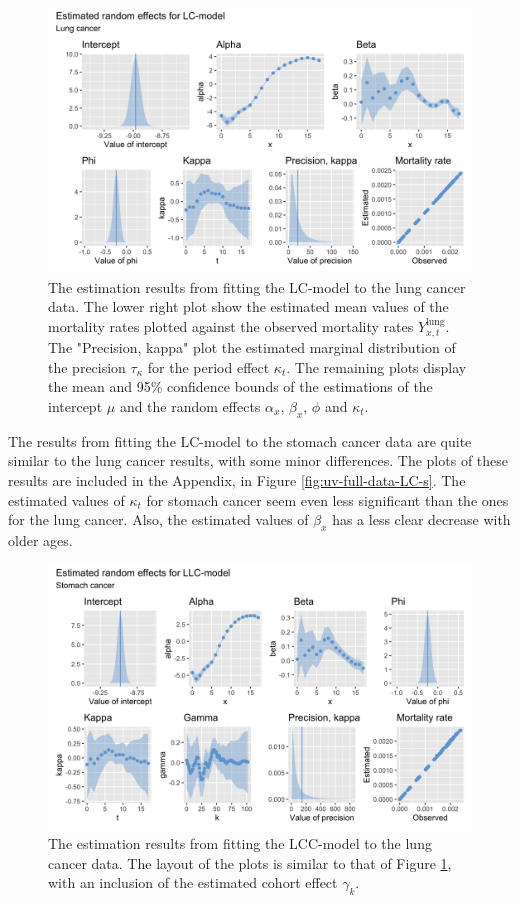 \begin{figure}[h!]
    \centering
    \includegraphics[width=0.85\linewidth]{real-data/real-data-univariate/Figures/uv-full-data-lc-l.png}
    \caption{The estimation results from fitting the LC-model to the lung cancer data. The lower right plot show the estimated mean values of the mortality rates plotted against the observed mortality rates $Y_{x,t}^{\text{lung}}$. The "Precision, kappa" plot the estimated marginal distribution of the precision $\tau_\kappa$ for the period effect $\kappa_t$. The remaining plots display the mean and 95\% confidence bounds of the estimations of the intercept $\mu$ and the random effects $\alpha_x$, $\beta_x$, $\phi$ and $\kappa_t$.}
    \label{fig:uv-full-data-LC-l}
\end{figure}

\newpar The results from fitting the LC-model to the stomach cancer data are quite similar to the lung cancer results, with some minor differences. The plots of these results are included in the Appendix, in Figure \ref{fig:uv-full-data-LC-s}. The estimated values of $\kappa_t$ for stomach cancer seem even less significant than the ones for the lung cancer. Also, the estimated values of $\beta_x$ has a less clear decrease with older ages. 

\begin{figure}[h!]
    \centering
    \includegraphics[width=0.85\linewidth]{real-data/real-data-univariate/Figures/uv-full-data-lcc-l.png}
    \caption{The estimation results from fitting the LCC-model to the lung cancer data. The layout of the plots is similar to that of Figure \ref{fig:uv-full-data-LC-l}, with an inclusion of the estimated cohort effect $\gamma_k$.}
    \label{fig:uv-full-data-LCC-l}
\end{figure}

